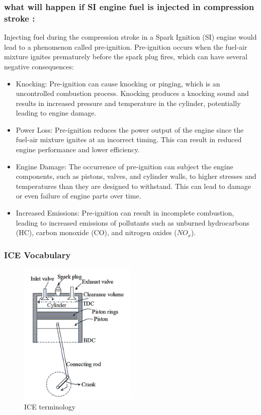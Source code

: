 \documentclass{article}
\begin{document}
\subsubsection*{what will happen if SI engine fuel is injected in compression stroke :}
Injecting fuel during the compression stroke in a Spark Ignition (SI) engine would lead to a phenomenon called pre-ignition. Pre-ignition occurs when the fuel-air mixture ignites prematurely before the spark plug fires, which can have several negative consequences:
\begin{itemize}
	\item Knocking: Pre-ignition can cause knocking or pinging, which is an uncontrolled combustion process. Knocking produces a knocking sound and results in increased pressure and temperature in the cylinder, potentially leading to engine damage.
	\item Power Loss: Pre-ignition reduces the power output of the engine since the fuel-air mixture ignites at an incorrect timing. This can result in reduced engine performance and lower efficiency.
	\item Engine Damage: The occurrence of pre-ignition can subject the engine components, such as pistons, valves, and cylinder walls, to higher stresses and temperatures than they are designed to withstand. This can lead to damage or even failure of engine parts over time.
	\item Increased Emissions: Pre-ignition can result in incomplete combustion, leading to increased emissions of pollutants such as unburned hydrocarbons (HC), carbon monoxide (CO), and nitrogen oxides ($NO_x$).
\end{itemize}


\subsubsection*{ICE Vocabulary}
\begin{figure}
    \centering
    \includegraphics[width=0.5\textwidth]{img/vocabulary.png}
    \caption{ICE terminology}
    \label{fig:ICE terminology}
\end{figure}
\end{document}
